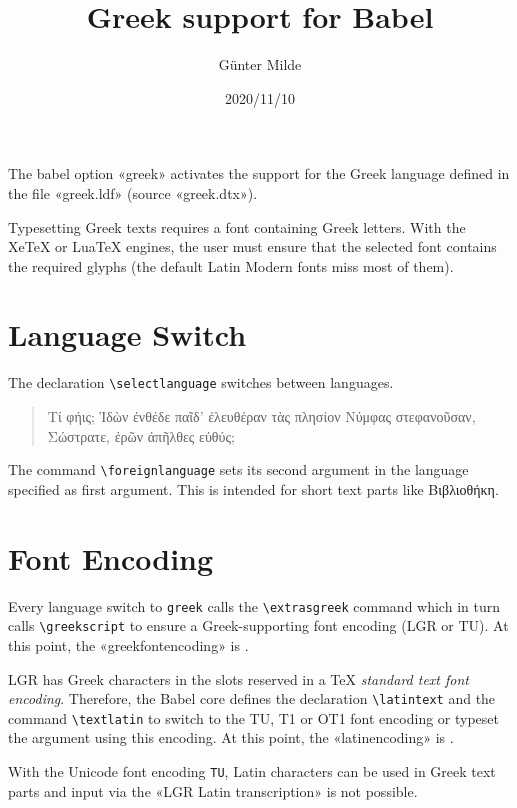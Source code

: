 \documentclass[a4paper]{article}
\begin{document}
\title{Greek support for Babel}
\author{Günter Milde}
\date{2020/11/10}
\maketitle

The babel option «greek» activates the support for the Greek language
defined in the file «greek.ldf» (source «greek.dtx»).

Typesetting Greek texts requires a font containing Greek letters. With the
XeTeX or LuaTeX engines, the user must ensure that the selected font
contains the required glyphs (the default Latin Modern fonts miss most of
them).

\section{Language Switch}

The declaration \verb|\selectlanguage| switches between languages.

\begin{quote}
  Τί φήις; Ἱδὼν ἐνθέδε παῖδ’ ἐλευθέραν
  τὰς πλησίον Νύμφας στεφανοῦσαν, Σώστρατε,
  ἐρῶν άπῆλθες εὐθύς;
\end{quote}

The command \verb|\foreignlanguage| sets its second argument in the language
specified as first argument. This is intended for short text parts like
\foreignlanguage{greek}{Βιβλιοθήκη}.

\section{Font Encoding}

Every language switch to \texttt{greek} calls the \verb|\extrasgreek|
command which in turn calls \verb|\greekscript| to ensure a Greek-supporting
font encoding (LGR or TU).  At this point, the «greekfontencoding»
is \texttt{\greekfontencoding}. 


LGR has Greek characters in the slots reserved in a TeX \emph{standard text
font encoding}. Therefore, the Babel core defines the declaration
\verb|\latintext| and the command \verb|\textlatin| to switch to the TU, T1
or OT1 font encoding or typeset the argument using this encoding. At this
point, the «latinencoding» is \texttt{\latinencoding}.

With the Unicode font encoding \texttt{TU},
Latin characters can be used in Greek text parts and
input via the «LGR Latin transcription» is not possible.
\end{document}
